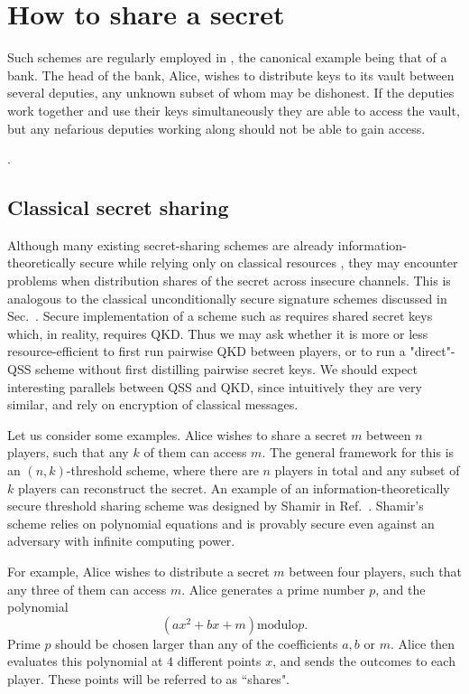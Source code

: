 \section{How to share a secret}\label{sec:qss_lit_review}
Such schemes are regularly employed in , the canonical example being that of a bank. The head of the bank, Alice, wishes to distribute keys to its vault between several deputies, any unknown subset of whom may be dishonest. If the deputies work together and use their keys simultaneously they are able to access the vault, but any nefarious deputies working along should not be able to gain access.

.


\subsection{Classical secret sharing}\label{sec:qss_qcss}
Although many existing secret-sharing schemes are already information-theoretically secure while relying only on classical resources , they may encounter problems when distribution shares of the secret across insecure channels.  This is analogous to the classical unconditionally secure signature schemes discussed in Sec.~. Secure implementation of a scheme such as  requires shared secret keys which, in reality, requires QKD. Thus we may ask whether it is more or less resource-efficient to first run pairwise QKD between players, or to run a "direct"-QSS scheme without first distilling pairwise secret keys. We should expect interesting parallels between QSS and QKD, since intuitively they are very similar, and rely on encryption of classical messages.

Let us consider some examples. Alice wishes to share a secret $m$ between $n$ players, such that any $k$ of them can access $m$. The general framework for this is an $\left(n, k\right)$-threshold scheme, where there are $n$ players in total and any subset of $k$ players can reconstruct the secret. An example of an information-theoretically secure threshold sharing scheme was designed by Shamir in Ref.~. Shamir's scheme relies on polynomial equations and is provably secure even against an adversary with infinite computing power. 

For example, Alice wishes to distribute a secret $m$ between four players, such that any three of them can access $m$. Alice generates a prime number $p$, and the polynomial 
\begin{equation}
\left( a x^2 + b x + m \right) \text{modulo} p.
\end{equation}
Prime $p$ should be chosen larger than any of the coefficients $a, b$ or $m$. Alice then evaluates this polynomial at $4$ different points $x$, and sends the outcomes to each player. These points will be referred to as ``shares".

